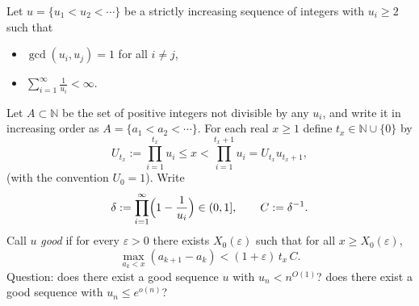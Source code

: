 Let $u=\{u_1<u_2<\cdots\}$ be a strictly increasing sequence of integers with $u_i\ge 2$ such that
\begin{itemize}
\item $\gcd(u_i,u_j)=1$ for all $i\ne j$,
\item $\sum_{i=1}^{\infty}\frac{1}{u_i}<\infty$.
\end{itemize}
Let $A\subset\mathbb N$ be the set of positive integers not divisible by any $u_i$, and write it in increasing order as
$A=\{a_1<a_2<\cdots\}$.
For each real $x\ge 1$ define $t_x\in\mathbb N\cup\{0\}$ by
\[
U_{t_x}:=\prod_{i=1}^{t_x}u_i\le x < \prod_{i=1}^{t_x+1}u_i=U_{t_x}u_{t_x+1},
\]
(with the convention $U_0=1$).
Write
\[\delta:=\prod_{i=1}^{\infty}\Bigl(1-\frac{1}{u_i}\Bigr)\in(0,1],\qquad C:=\delta^{-1}.
\]
Call $u$ \emph{good} if for every $\varepsilon>0$ there exists $X_0(\varepsilon)$ such that for all $x\ge X_0(\varepsilon)$,
\[
\max_{a_k<x}(a_{k+1}-a_k) < (1+\varepsilon)\,t_x\,C.
\]
Question: does there exist a good sequence $u$ with $u_n<n^{O(1)}$? does there exist a good sequence with $u_n\le e^{o(n)}$?
